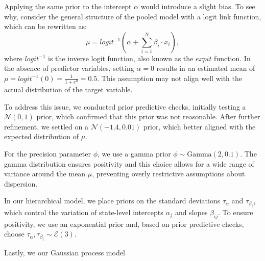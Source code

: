 Applying the same prior to the intercept $\alpha$ would introduce a slight bias. To see why, consider the general structure of the pooled model with a logit link function, which can be rewritten as:
\[
\mu = logit^{-1}(\alpha + \sum_{i=1}^N{\beta_i \cdot x_i}),
\]
where $logit^{-1}$ is the inverse logit function, also known as the $expit$ function. In the absence of predictor variables, setting $\alpha = 0$ results in an estimated mean of $\mu = logit^{-1}(0) = \frac{1}{1+e^{0}} = 0.5$. This assumption may not align well with the actual distribution of the target variable.

To address this issue, we conducted prior predictive checks, initially testing a $\mathcal{N}(0,1)$ prior, which confirmed that this prior was not reasonable. After further refinement, we settled on a $\mathcal{N}(-1.4,0.01)$ prior, which better aligned with the expected distribution of $\mu$.

For the precision parameter $\phi$, we use a gamma prior $\phi \sim \text{Gamma}(2,0.1)$. The gamma distribution ensures positivity and this choice allows for a wide range of variance around the mean $\mu$, preventing overly restrictive assumptions about dispersion. 

In our hierarchical model, we place priors on the standard deviations $\tau_\alpha$ and $\tau_{\beta_i}$, which control the variation of state-level intercepts $\alpha_j$ and slopes $\beta_{ij}$. To ensure positivity, we use an exponential prior and, based on prior predictive checks, choose $\tau_\alpha, \tau_{\beta_i} \sim \mathcal{E}(3)$.

Lastly, we our Gaussian process model 